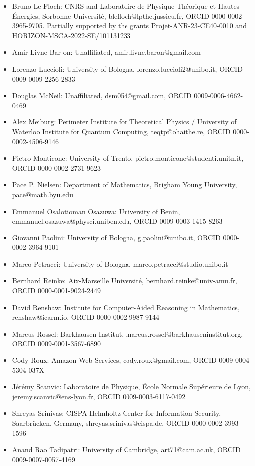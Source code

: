 \begin{itemize}
    \item Bruno Le Floch: CNRS and Laboratoire de Physique Th\'eorique et Hautes \'Energies, Sorbonne Universit\'e, blefloch@lpthe.jussieu.fr, ORCID 0000-0002-3965-9705. Partially supported by the grants Projet-ANR-23-CE40-0010 and HORIZON-MSCA-2022-SE/101131233
    \item Amir Livne Bar-on: Unaffiliated, amir.livne.baron@gmail.com
    \item Lorenzo Luccioli: University of Bologna, lorenzo.luccioli2@unibo.it, ORCID 0009-0009-2256-2833
    \item Douglas McNeil: Unaffiliated, dsm054@gmail.com, ORCID 0009-0006-4662-0469
    \item Alex Meiburg: Perimeter Institute for Theoretical Physics / University of Waterloo Institute for Quantum Computing, teqtp@ohaithe.re, ORCID 0000-0002-4506-9146
    \item Pietro Monticone: University of Trento, pietro.monticone@studenti.unitn.it, ORCID 0000-0002-2731-9623
    \item Pace P. Nielsen: Department of Mathematics, Brigham Young University, pace@math.byu.edu
    \item Emmanuel Osalotioman Osazuwa: University of Benin, emmanuel.osazuwa@physci.uniben.edu, ORCID 0009-0003-1415-8263
    \item Giovanni Paolini: University of Bologna, g.paolini@unibo.it, ORCID 0000-0002-3964-9101
    \item Marco Petracci: University of Bologna, marco.petracci@studio.unibo.it
    \item Bernhard Reinke: Aix-Marseille Université, bernhard.reinke@univ-amu.fr, ORCID 0000-0001-9024-2449
    \item David Renshaw: Institute for Computer-Aided Reasoning in Mathematics, renshaw@icarm.io, ORCID 0000-0002-9987-9144
    \item Marcus Rossel: Barkhausen Institut, marcus.rossel@barkhauseninstitut.org, ORCID 0009-0001-3567-6890
    \item Cody Roux: Amazon Web Services, cody.roux@gmail.com, ORCID 0009-0004-5304-037X
    \item J\'er\'emy Scanvic: Laboratoire de Physique, École Normale Supérieure de Lyon, jeremy.scanvic@ens-lyon.fr, ORCID 0009-0003-6117-0492
    \item Shreyas Srinivas: CISPA Helmholtz Center for Information Security, Saarbr\"{u}cken, Germany, shreyas.srinivas@cispa.de, ORCID 0000-0002-3993-1596
    \item Anand Rao Tadipatri: University of Cambridge, art71@cam.ac.uk, ORCID 0009-0007-0057-4169

\end{itemize}
